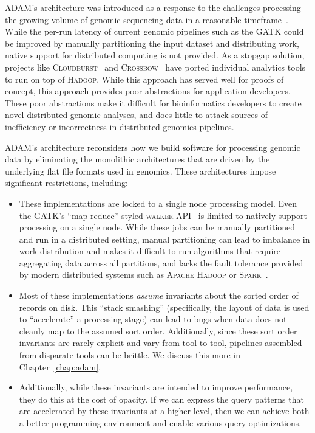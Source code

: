 \documentclass[phd]{ucbthesis}
\begin{document}
\textsc{ADAM}'s architecture was introduced as a response to the challenges
processing the growing volume of genomic sequencing data in a reasonable
timeframe~\cite{schadt10, stein10}. While the per-run latency of current genomic
pipelines such as the \textsc{GATK} could be improved by manually partitioning
the input dataset and distributing work, native support for distributed
computing is not provided. As a stopgap solution, projects like
\textsc{Cloudburst}~\cite{schatz09} and \textsc{Crossbow}~\cite{langmead09}
have ported individual analytics tools to run on top of \textsc{Hadoop}. While
this approach has served well for proofs of concept, this approach provides poor
abstractions for application developers. These poor abstractions make it
difficult for bioinformatics developers to create novel distributed genomic
analyses, and does little to attack sources of inefficiency or incorrectness in
distributed genomics pipelines.

\textsc{ADAM}'s architecture reconsiders how we build software for processing
genomic data by eliminating the monolithic architectures that are driven by the
underlying flat file formats used in genomics. These architectures impose
significant restrictions, including:

\begin{itemize}
\item These implementations are locked to a single node processing model. Even
  the \textsc{GATK}'s ``map-reduce'' styled \textsc{walker} API~\cite{mckenna10}
  is limited to natively support processing on a single node. While these jobs
  can be manually partitioned and run in a distributed setting, manual
  partitioning can lead to imbalance in work distribution and makes it difficult
  to run algorithms that require aggregating data across all partitions, and
  lacks the fault tolerance provided by modern distributed systems such as
  \textsc{Apache Hadoop} or \textsc{Spark}~\cite{zaharia12}.
\item Most of these implementations \emph{assume} invariants about the sorted
  order of records on disk. This ``stack smashing'' (specifically, the layout
  of data is used to ``accelerate'' a processing stage) can lead to bugs when
  data does not cleanly map to the assumed sort order. Additionally, since these
  sort order invariants are rarely explicit and vary from tool to tool,
  pipelines assembled from disparate tools can be brittle. We discuss this more
  in Chapter~\ref{chap:adam}.
\item Additionally, while these invariants are intended to improve performance,
  they do this at the cost of opacity. If we can express the query patterns that
  are accelerated by these invariants at a higher level, then we can achieve
  both a better programming environment and enable various query optimizations.
\end{itemize}
\end{document}
